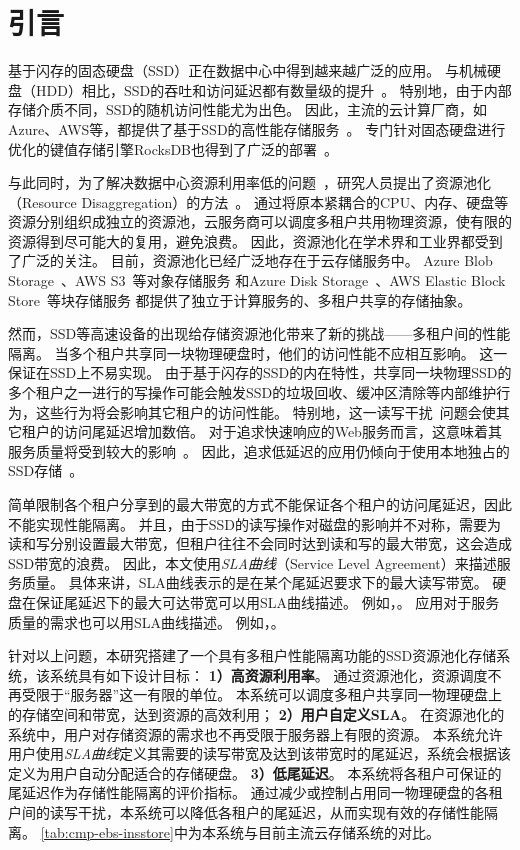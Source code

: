 
\chapter{引言}
\label{chap:intro}

基于闪存的固态硬盘（SSD）正在数据中心中得到越来越广泛的应用。
与机械硬盘（HDD）相比，SSD的吞吐和访问延迟都有数量级的提升~\cite{chen2009understanding}。
特别地，由于内部存储介质不同，SSD的随机访问性能尤为出色。
因此，主流的云计算厂商，如Azure、AWS等，都提供了基于SSD的高性能存储服务~\cite{awsebs,azuredisks}。
专门针对固态硬盘进行优化的键值存储引擎RocksDB也得到了广泛的部署~\cite{cao2020characterizing,rocksdb,siying2021rocksdb}。

与此同时，为了解决数据中心资源利用率低的问题~\cite{kanev2015profiling}，研究人员提出了资源池化（Resource Disaggregation）的方法~\cite{shan2018legoos,klimovic2016flash}。
通过将原本紧耦合的CPU、内存、硬盘等资源分别组织成独立的资源池，云服务商可以调度多租户共用物理资源，使有限的资源得到尽可能大的复用，避免浪费。
因此，资源池化在学术界和工业界都受到了广泛的关注。
目前，资源池化已经广泛地存在于云存储服务中。
Azure Blob Storage~\cite{azureblob}、AWS S3~\cite{awss3}等对象存储服务
和Azure Disk Storage~\cite{azuredisks}、AWS Elastic Block Store~\cite{awsebs}等块存储服务
都提供了独立于计算服务的、多租户共享的存储抽象。

然而，SSD等高速设备的出现给存储资源池化带来了新的挑战——多租户间的性能隔离。
当多个租户共享同一块物理硬盘时，他们的访问性能不应相互影响。
这一保证在SSD上不易实现。
由于基于闪存的SSD的内在特性，共享同一块物理SSD的多个租户之一进行的写操作可能会触发SSD的垃圾回收、缓冲区清除等内部维护行为，这些行为将会影响其它租户的访问性能。
特别地，这一读写干扰~\cite{klimovic2017reflex}问题会使其它租户的访问尾延迟增加数倍。
对于追求快速响应的Web服务而言，这意味着其服务质量将受到较大的影响~\cite{dean2013tail}。
因此，追求低延迟的应用仍倾向于使用本地独占的SSD存储~\cite{awsvm,azurevm}。

简单限制各个租户分享到的最大带宽的方式不能保证各个租户的访问尾延迟，因此不能实现性能隔离。
并且，由于SSD的读写操作对磁盘的影响并不对称，需要为读和写分别设置最大带宽，但租户往往不会同时达到读和写的最大带宽，这会造成SSD带宽的浪费。
因此，本文使用\textit{SLA曲线}（Service Level Agreement）来描述服务质量。
具体来讲，SLA曲线表示的是在某个尾延迟要求下的最大读写带宽。
硬盘在保证尾延迟下的最大可达带宽可以用SLA曲线描述。
例如，。
应用对于服务质量的需求也可以用SLA曲线描述。
例如，。

针对以上问题，本研究搭建了一个具有多租户性能隔离功能的SSD资源池化存储系统，该系统具有如下设计目标：
\textbf{1）高资源利用率}。
通过资源池化，资源调度不再受限于“服务器”这一有限的单位。
本系统可以调度多租户共享同一物理硬盘上的存储空间和带宽，达到资源的高效利用；
\textbf{2）用户自定义SLA}。
在资源池化的系统中，用户对存储资源的需求也不再受限于服务器上有限的资源。
本系统允许用户使用\textit{SLA曲线}定义其需要的读写带宽及达到该带宽时的尾延迟，系统会根据该定义为用户自动分配适合的存储硬盘。
\textbf{3）低尾延迟}。
本系统将各租户可保证的尾延迟作为存储性能隔离的评价指标。
通过减少或控制占用同一物理硬盘的各租户间的读写干扰，本系统可以降低各租户的尾延迟，从而实现有效的存储性能隔离。
\autoref{tab:cmp-ebs-insstore}中为本系统与目前主流云存储系统的对比。

